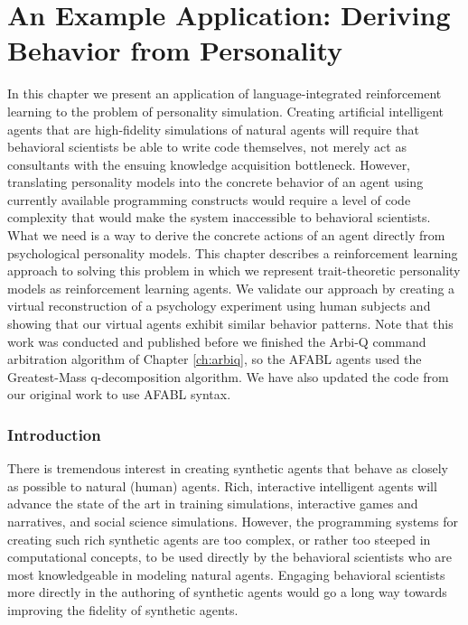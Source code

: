 \chapter{An Example Application: Deriving Behavior from Personality}\label{ch:applications}

In this chapter we present an application of language-integrated reinforcement learning to the problem of personality simulation. Creating artificial intelligent agents that are high-fidelity simulations of natural agents will require that behavioral scientists be able to write code themselves, not merely act as consultants with the ensuing knowledge acquisition bottleneck. However, translating personality models into the concrete behavior of an agent using currently available programming constructs would require a level of code complexity that would make the system inaccessible to behavioral scientists.  What we need is a way to derive the concrete actions of an agent directly from psychological personality models.  This chapter describes a reinforcement learning approach to solving this problem in which we represent trait-theoretic personality models as reinforcement learning agents.  We validate our approach by creating a virtual reconstruction of a psychology experiment using human subjects and showing that our virtual agents exhibit similar behavior patterns. Note that this work was conducted and published before we finished the Arbi-Q command arbitration algorithm of Chapter \ref{ch:arbiq}, so the AFABL agents used the Greatest-Mass q-decomposition algorithm. We have also updated the code from our original work to use AFABL syntax.


\subsection{Introduction}

There is tremendous interest in creating synthetic agents that behave as closely as possible to natural (human) agents.  Rich, interactive intelligent agents will advance the state of the art in training simulations, interactive games and narratives, and social science simulations.  However, the programming systems for creating such rich synthetic agents are too complex, or rather too steeped in computational concepts, to be used directly by the behavioral scientists who are most knowledgeable in modeling natural agents. Engaging behavioral scientists more directly in the authoring of synthetic agents would go a long way towards improving the fidelity of synthetic agents.

